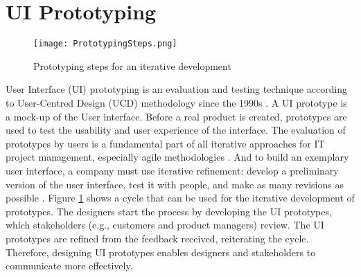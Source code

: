 \section{UI Prototyping}
\label{background:section:uiprototyping}
\begin{figure}[htbp!]
  \centering    
  \texttt{[image: PrototypingSteps.png]}
  \caption[Steps of Prototyping]{Prototyping steps for an iterative development}
  \label{fig:background:stepsPrototyping}
\end{figure}
User Interface (UI) prototyping is an evaluation and testing technique according to User-Centred Design (UCD) methodology since the 1990s \cite{article:prototyping:preece}.
A UI prototype is a mock-up of the User interface.
Before a real product is created, prototypes are used to test the usability and user experience of the interface.
The evaluation of prototypes by users is a fundamental part of all iterative approaches for IT project management, especially agile methodologies \cite{article:prototyping:schwaber}.
And to build an exemplary user interface, a company must use iterative refinement: develop a preliminary version of the user interface, test it with people, and make as many revisions as possible \cite{article:prototyping:gould}.
Figure \ref{fig:background:stepsPrototyping} shows a cycle that can be used for the iterative development of prototypes.
The designers start the process by developing the UI prototypes, which stakeholders (e.g., customers and product managers) review. The UI prototypes are refined from the feedback received, reiterating the cycle.
Therefore, designing UI prototypes enables designers and stakeholders to communicate more effectively.

